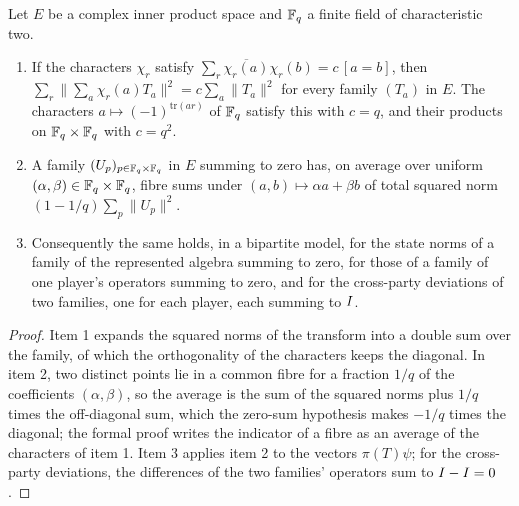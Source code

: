 \begin{lemma}
\label{lem:model-parseval}
\leanok
Let $E$ be a complex inner product space and $\mathbb{F}_q$ a finite field of characteristic two.
\begin{enumerate}
  \item If the characters $\chi_r$ satisfy $\sum_r \overline{\chi_r(a)}\chi_r(b) = c\,[a = b]$, then
    $\sum_r \|\sum_a \chi_r(a) T_a\|^2 = c \sum_a \|T_a\|^2$ for every family $(T_a)$ in $E$. The
    characters $a \mapsto (-1)^{\mathrm{tr}(ar)}$ of $\mathbb{F}_q$ satisfy this with $c = q$, and their
    products on $\mathbb{F}_q \times \mathbb{F}_q$ with $c = q^2$.
  \item A family $(U_p)_{p \in \mathbb{F}_q \times \mathbb{F}_q}$ in $E$ summing to zero has, on average over
    uniform $(\alpha, \beta) \in \mathbb{F}_q \times \mathbb{F}_q$, fibre sums under $(a, b) \mapsto \alpha a +
    \beta b$ of total squared norm $(1 - 1/q) \sum_p \|U_p\|^2$.
  \item Consequently the same holds, in a bipartite model, for the state norms of a family of the
    represented algebra summing to zero, for those of a family of one player's operators summing to
    zero, and for the cross-party deviations of two families, one for each player, each summing to
    $I$.
\end{enumerate}
\end{lemma}

\begin{proof}
\leanok
Item 1 expands the squared norms of the transform into a double sum over the family, of which the
orthogonality of the characters keeps the diagonal. In item 2, two distinct points lie in a common
fibre for a fraction $1/q$ of the coefficients $(\alpha, \beta)$, so the average is the sum of the
squared norms plus $1/q$ times the off-diagonal sum, which the zero-sum hypothesis makes $-1/q$
times the diagonal; the formal proof writes the indicator of a fibre as an average of the characters
of item 1. Item 3 applies item 2 to the vectors $\pi(T)\psi$; for the cross-party deviations, the
differences of the two families' operators sum to $I - I = 0$.
\end{proof}

